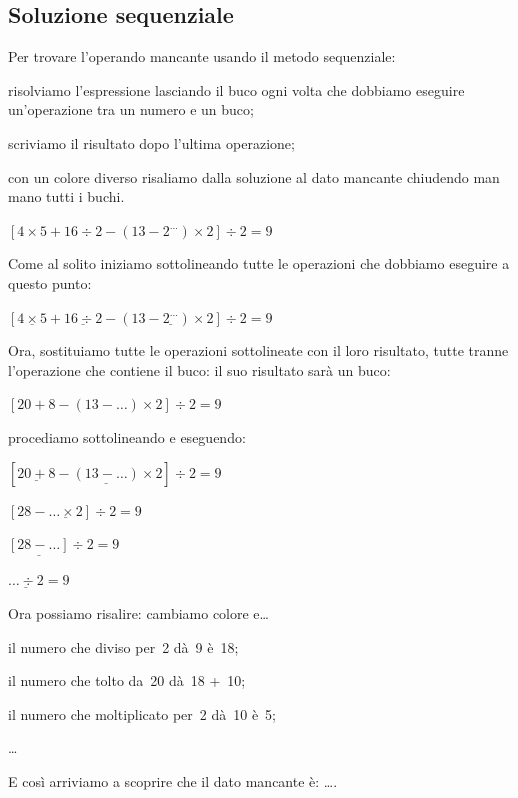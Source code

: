 
\subsection{Soluzione sequenziale}

\begin{procedura}
 Per trovare l'operando mancante usando il metodo sequenziale:
\begin{enumerate*}
 \item risolviamo l'espressione lasciando il buco ogni volta che 
  dobbiamo eseguire un'operazione tra un numero e un buco;
 \item scriviamo il risultato dopo l'ultima operazione;
 \item con un colore diverso risaliamo dalla soluzione al dato mancante
  chiudendo man mano tutti i buchi.
\end{enumerate*}
\end{procedura}

  \begin{esempio}
  \(\left[ 4 \times 5 + 16 \div 2 -
   \left(13 - 2^{\dots} \right) \times 2 \right] \div 2 = 9\)
  
  Come al solito iniziamo sottolineando tutte le operazioni che dobbiamo 
  eseguire a questo punto:
  
  \(\left[ \underline{4 \times 5} + \underline{16 \div 2} -
   \left(13 - \underline{2^{\dots}} \right) \times 2 \right] \div 2 = 9\)
  
  Ora, sostituiamo tutte le operazioni sottolineate con il loro risultato, 
  tutte tranne l'operazione che contiene il buco: il suo risultato sarà un 
  buco:
  
  \(\left[ 20 + 8 -
   \left(13 - {\dots} \right) \times 2 \right] \div 2 = 9\)
   
  procediamo sottolineando e eseguendo:
  
  \(\left[ \underline{20 + 8} -
   \underline{\left(13 - {\dots} \right)} \times 2 \right] \div 2 = 9\)
  
  \(\left[ 28 - \underline{{\dots} \times 2} \right] \div 2 = 9\)
  
  \(\underline{\left[ 28 - {\dots} \right]} \div 2 = 9\)
  
  \(\underline{{\dots} \div 2} = 9\)
  
  Ora possiamo risalire: cambiamo colore e\dots
  
  \begin{itemize*}
   \item il numero che diviso per~2 dà~9 è~18;
   \item il numero che tolto da~20 dà~18 +~10;
   \item il numero che moltiplicato per~2 dà~10 è~5;
   \item \dots
  \end{itemize*}

 E così arriviamo a scoprire che il dato mancante è: \dots.
 
 \end{esempio}

